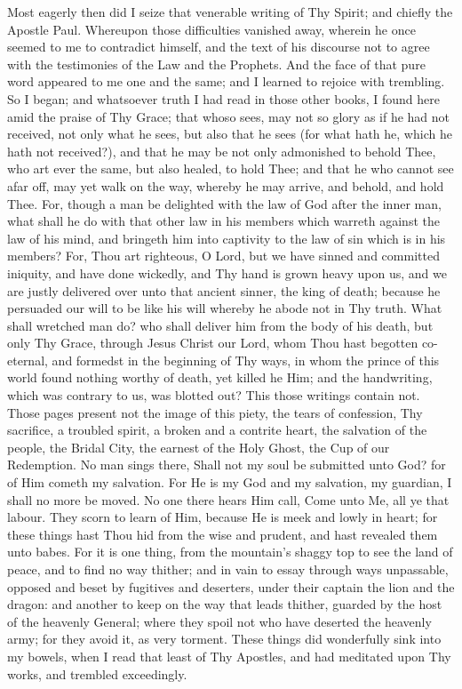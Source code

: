 \documentclass[b5paper,openright,12pt,twoside]{book}
\begin{document}
Most eagerly then did I seize that venerable writing of Thy Spirit; and
chiefly the Apostle Paul. Whereupon those difficulties vanished away,
wherein he once seemed to me to contradict himself, and the text of his
discourse not to agree with the testimonies of the Law and the Prophets.
And the face of that pure word appeared to me one and the same; and I
learned to rejoice with trembling. So I began; and whatsoever truth
I had read in those other books, I found here amid the praise of Thy
Grace; that whoso sees, may not so glory as if he had not received, not
only what he sees, but also that he sees (for what hath he, which he
hath not received?), and that he may be not only admonished to behold
Thee, who art ever the same, but also healed, to hold Thee; and that he
who cannot see afar off, may yet walk on the way, whereby he may arrive,
and behold, and hold Thee. For, though a man be delighted with the law
of God after the inner man, what shall he do with that other law in his
members which warreth against the law of his mind, and bringeth him
into captivity to the law of sin which is in his members? For, Thou art
righteous, O Lord, but we have sinned and committed iniquity, and have
done wickedly, and Thy hand is grown heavy upon us, and we are justly
delivered over unto that ancient sinner, the king of death; because
he persuaded our will to be like his will whereby he abode not in Thy
truth. What shall wretched man do? who shall deliver him from the body
of his death, but only Thy Grace, through Jesus Christ our Lord, whom
Thou hast begotten co-eternal, and formedst in the beginning of Thy
ways, in whom the prince of this world found nothing worthy of death,
yet killed he Him; and the handwriting, which was contrary to us, was
blotted out? This those writings contain not. Those pages present not
the image of this piety, the tears of confession, Thy sacrifice, a
troubled spirit, a broken and a contrite heart, the salvation of the
people, the Bridal City, the earnest of the Holy Ghost, the Cup of our
Redemption. No man sings there, Shall not my soul be submitted unto God?
for of Him cometh my salvation. For He is my God and my salvation, my
guardian, I shall no more be moved. No one there hears Him call, Come
unto Me, all ye that labour. They scorn to learn of Him, because He is
meek and lowly in heart; for these things hast Thou hid from the wise
and prudent, and hast revealed them unto babes. For it is one thing,
from the mountain's shaggy top to see the land of peace, and to find no
way thither; and in vain to essay through ways unpassable, opposed and
beset by fugitives and deserters, under their captain the lion and the
dragon: and another to keep on the way that leads thither, guarded by
the host of the heavenly General; where they spoil not who have deserted
the heavenly army; for they avoid it, as very torment. These things did
wonderfully sink into my bowels, when I read that least of Thy Apostles,
and had meditated upon Thy works, and trembled exceedingly.
\end{document}
